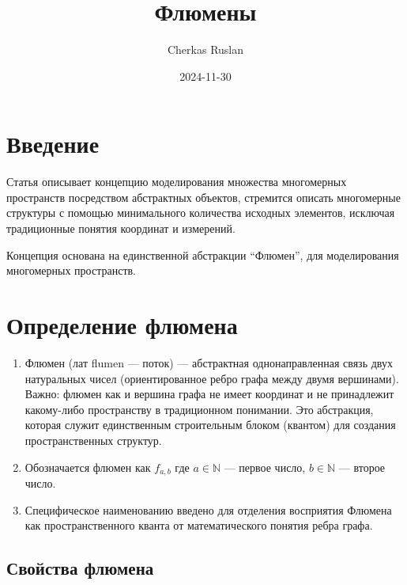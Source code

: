 \documentclass[final]{article}
\begin{document}
    \title{Флюмены}
    \author{Cherkas Ruslan}
    \date{2024-11-30}

    \maketitle
    \tableofcontents

    \section{Введение}

        Статья описывает концепцию моделирования множества многомерных 
        пространств посредством абстрактных объектов, стремится описать 
        многомерные структуры с помощью минимального количества исходных 
        элементов, исключая традиционные понятия координат и измерений.

        Концепция основана на единственной абстракции ``Флюмен'', для 
        моделирования многомерных пространств.

    \section{Определение флюмена} 

        \begin{enumerate}

            \item Флюмен (лат flumen — поток) — абстрактная однонаправленная 
            связь двух натуральных чисел (ориентированное ребро графа между 
            двумя вершинами). Важно: флюмен как и вершина графа не имеет 
            координат и не принадлежит какому-либо пространству в традиционном 
            понимании. Это абстракция, которая служит единственным строительным 
            блоком (квантом) для создания пространственных структур.

            \item Обозначается флюмен как \( f_{a,b} \) где \( a \in \mathbb{N} \) — 
            первое число, \( b \in \mathbb{N} \) — второе число.

            \item Специфическое наименованию введено для отделения восприятия 
            Флюмена как пространственного кванта от математического понятия ребра 
            графа.

        \end{enumerate}



    \subsection{Свойства флюмена}
\end{document}
